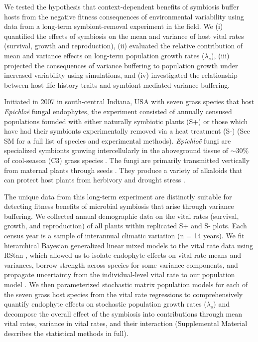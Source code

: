 \documentclass[12pt]{article}
\begin{document}
We tested the hypothesis that context-dependent benefits of symbiosis buffer hosts from the negative fitness consequences of environmental variability using data from a long-term symbiont-removal experiment in the field. 
We  (i) quantified the effects of symbiosis on the mean and variance of host vital rates (survival, growth and reproduction), (ii) evaluated the relative contribution of mean and variance effects on long-term population growth rates ($\lambda_s$), (iii) projected the consequences of variance buffering to population growth under increased variability using simulations, and (iv) investigated the relationship between host life history traits and symbiont-mediated variance buffering.

Initiated in 2007 in south-central Indiana, USA with seven grass species that host \emph{Epichlo\"{e}} fungal endophytes, the experiment consisted of annually censused populations founded with either naturally symbiotic plants (S+) or those which have had their symbionts experimentally removed  via a heat treatment (S-) (See SM for a full list of species and experimental methods).
\emph{Epichlo\"{e}} fungi are specialized symbionts growing intercellularly in the aboveground tissue of  $\sim30$\% of cool-season (C3) grass species \cite{leuchtmann1992systematics}.
The fungi are primarily transmitted vertically from maternal plants through seeds \cite{cheplick2009ecology,rudgers2009fungus}.
They produce a variety of alkaloids that can protect host plants from herbivory \cite{brem2001epichloe} and drought stress \cite{cheplick2004recovery,kannadan2008endophyte,decunta2021systematic}.

The unique data from this long-term experiment are distinctly suitable for detecting fitness benefits of microbial symbiosis that arise through variance buffering. 
We collected annual demographic data on the vital rates (survival, growth, and reproduction) of all plants within replicated S+ and S- plots. 
Each census year is a sample of interannual climatic variation (n = 14 years).
We fit hierarchical Bayesian generalized linear mixed models to the vital rate data using RStan \cite{rstan2022}, which allowed us to isolate endophyte effects on vital rate means and variances, borrow strength across species for some variance components, and propagate uncertainty from the individual-level vital rate to our population model \cite{elderd2016quantifying}. 
We then parameterized stochastic matrix population models for each of the seven grass host species from the vital rate regressions to comprehensively quantify endophyte effects on stochastic population growth rates ($\lambda_s$) and decompose the overall effect of the symbiosis into contributions through mean vital rates, variance in vital rates, and their interaction (Supplemental Material describes the statistical methods in full).
\end{document}
